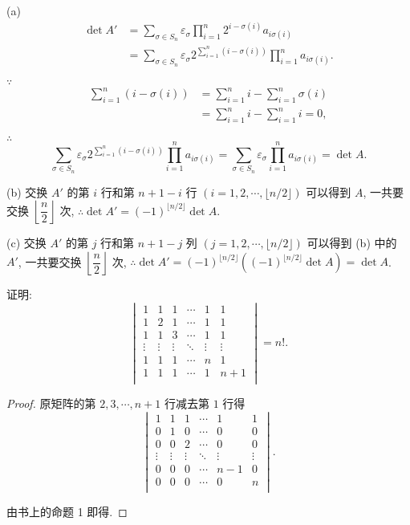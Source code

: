 \documentclass{ctexart}
\begin{document}
\begin{solution}
    (a)
    \begin{align*}
        \det A' & =\sum\limits_{\sigma\in S_n}\varepsilon_\sigma\prod\limits_{i=1}^n2^{i-\sigma(i)}a_{i\sigma(i)} \\
        & =\sum\limits_{\sigma\in S_n}\varepsilon_\sigma2^{\sum\limits_{i=1}^n (i-\sigma(i))}\prod\limits_{i=1}^na_{i\sigma(i)}.
    \end{align*}

    $\because$
    \begin{align*}
        \sum\limits_{i=1}^n (i-\sigma(i)) & =\sum\limits_{i=1}^ni-\sum\limits_{i=1}^n\sigma(i) \\
        & =\sum\limits_{i=1}^ni-\sum\limits_{i=1}^ni=0,
    \end{align*}

    $\therefore$
    \[\sum\limits_{\sigma\in S_n}\varepsilon_\sigma2^{\sum\limits_{i=1}^n(i-\sigma(i))}\prod\limits_{i=1}^na_{i\sigma(i)}=\sum\limits_{\sigma\in S_n}\varepsilon_\sigma\prod\limits_{i=1}^na_{i\sigma(i)}=\det A.\]

    (b) 交换 $A'$ 的第 $i$ 行和第 $n+1-i$ 行 $(i=1,2,\cdots,\lfloor n/2\rfloor)$ 可以得到 $A$, 一共要交换 $\left\lfloor\dfrac{n}{2}\right\rfloor$ 次, $\therefore\det A'=(-1)^{\lfloor n/2\rfloor}\det A$.

    (c) 交换 $A'$ 的第 $j$ 行和第 $n+1-j$ 列 $(j=1,2,\cdots,\lfloor n/2\rfloor)$ 可以得到 (b) 中的 $A'$, 一共要交换 $\left\lfloor\dfrac{n}{2}\right\rfloor$ 次, $\therefore\det A'=(-1)^{\lfloor n/2\rfloor}((-1)^{\lfloor n/2\rfloor}\det A)=\det A$.
\end{solution}
\begin{exercise}%
    证明:
    \[\begin{vmatrix}
    1 & 1 & 1 & \cdots & 1 & 1 \\
    1 & 2 & 1 & \cdots & 1 & 1 \\
    1 & 1 & 3 & \cdots & 1 & 1 \\
    \vdots & \vdots & \vdots & \ddots & \vdots & \vdots \\
    1 & 1 & 1 & \cdots  & n & 1 \\
    1 & 1 & 1 & \cdots  & 1 & n+1 \\
\end{vmatrix}=n!.\]
\end{exercise}
\begin{proof}
    原矩阵的第 $2,3,\cdots,n+1$ 行减去第 $1$ 行得
    \[\begin{vmatrix}
        1 & 1 & 1 & \cdots & 1 & 1 \\
        0 & 1 & 0 & \cdots & 0 & 0 \\
        0 & 0 & 2 & \cdots & 0 & 0 \\
        \vdots & \vdots & \vdots & \ddots & \vdots & \vdots \\
        0 & 0 & 0 & \cdots  & n-1 & 0 \\
        0 & 0 & 0 & \cdots  & 0 & n \\
    \end{vmatrix}.\]

    由书上的命题 1 即得.
\end{proof}
\end{document}
